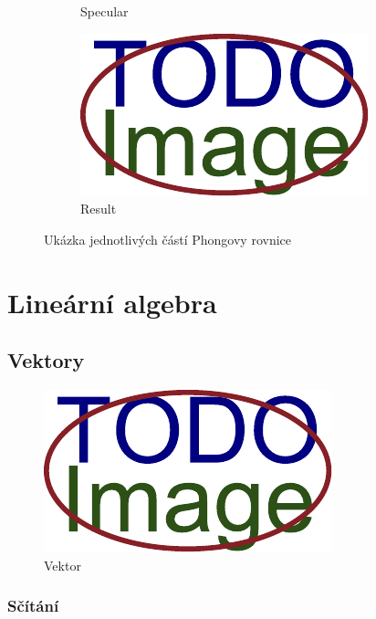\begin{figure}[H]
\begin{subfigure}{0.24\textwidth}
		\caption{Specular}
		\label{fig:opengl:phong:specular}
	\end{subfigure}
	\hfill
	\begin{subfigure}{0.24\textwidth}
		\includegraphics[width=\textwidth]{obrazky-figures/placeholder.pdf}
		\caption{Result}
		\label{fig:opengl:phong:result}
	\end{subfigure}
	\caption{Ukázka jednotlivých částí Phongovy rovnice}
	\label{fig:opengl:phong}
\end{figure}



\section{Lineární algebra}\label{ch:teorie:lineární-algebra}

\subsection{Vektory}\label{ch:teorie:lineární-algebra:vektory}

\begin{figure}[H]
	\centering
	\includegraphics[width=.33\linewidth]{obrazky-figures/placeholder.pdf}
	\caption{Vektor}
	\label{fig:lineární-algebra:vektor}
\end{figure}

\subsubsection*{Sčítání}

